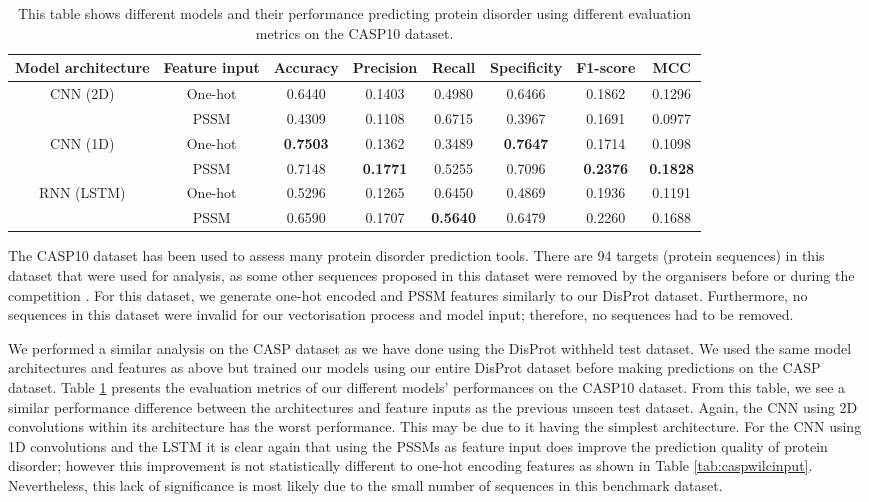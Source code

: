 \documentclass{l4proj}
\begin{document}
\begin{table}
    \centering
    \caption{This table shows different models and their performance predicting protein disorder using different evaluation metrics on the CASP10 dataset.}
    \begin{tabular}{@{}cccccccc@{}}
    \toprule
    Model architecture & Feature input & Accuracy & Precision & Recall & Specificity & F1-score & MCC \\ \midrule
    \multirow{2}{*}{CNN (2D)} & One-hot & 0.6440 & 0.1403 & 0.4980 & 0.6466 & 0.1862 & 0.1296 \\
     & PSSM & 0.4309 & 0.1108 & 0.6715 & 0.3967 & 0.1691 & 0.0977 \\
    \multirow{2}{*}{CNN (1D)} & One-hot & \textbf{0.7503} & 0.1362 & 0.3489 & \textbf{0.7647} & 0.1714 & 0.1098 \\
     & PSSM & 0.7148 & \textbf{0.1771} & 0.5255 & 0.7096 & \textbf{0.2376} & \textbf{0.1828} \\
    \multirow{2}{*}{RNN (LSTM)} & One-hot & 0.5296 & 0.1265 & 0.6450 & 0.4869 & 0.1936 & 0.1191 \\
     & PSSM & 0.6590 & 0.1707 & \textbf{0.5640} & 0.6479 & 0.2260 & 0.1688 \\ \cmidrule(l){1-8}
    \end{tabular}
    
    \label{tab:caspDataset}
\end{table}

The CASP10 dataset has been used to assess many protein disorder prediction tools. There are 94 targets (protein sequences) in this dataset that were used for analysis, as some other sequences proposed in this dataset were removed by the organisers before or during the competition \citep{Moult:14}. For this dataset, we generate one-hot encoded and PSSM features similarly to our DisProt dataset. Furthermore, no sequences in this dataset were invalid for our vectorisation process and model input; therefore, no sequences had to be removed.

We performed a similar analysis on the CASP dataset as we have done using the DisProt withheld test dataset. We used the same model architectures and features as above but trained our models using our entire DisProt dataset before making predictions on the CASP dataset. Table \ref{tab:caspDataset} presents the evaluation metrics of our different models' performances on the CASP10 dataset. From this table, we see a similar performance difference between the architectures and feature inputs as the previous unseen test dataset. Again, the CNN using 2D convolutions within its architecture has the worst performance. This may be due to it having the simplest architecture. For the CNN using 1D convolutions and the LSTM it is clear again that using the PSSMs as feature input does improve the prediction quality of protein disorder; however this improvement is not statistically different to one-hot encoding features as shown in Table \ref{tab:caspwilcinput}. Nevertheless, this lack of significance is most likely due to the small number of sequences in this benchmark dataset.
\end{document}
